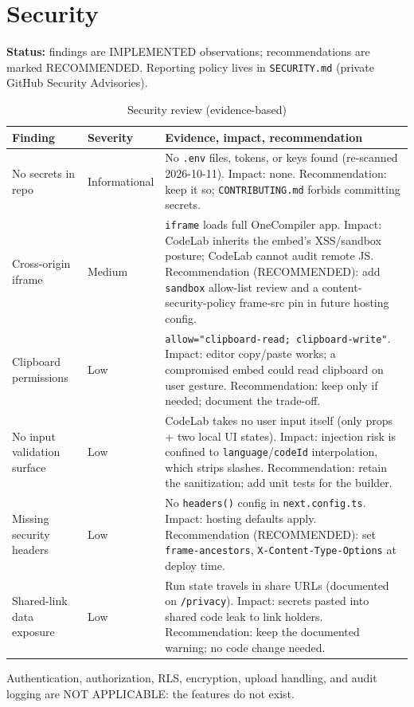 \section{Security}
\label{sec:security}

\textbf{Status:} findings are IMPLEMENTED observations; recommendations are marked RECOMMENDED. Reporting policy lives in \texttt{SECURITY.md} (private GitHub Security Advisories).

\begin{table}[H]
\centering
\caption{Security review (evidence-based)}
\begin{tabular}{|p{2.6cm}|l|p{7.5cm}|}
\hline
\textbf{Finding} & \textbf{Severity} & \textbf{Evidence, impact, recommendation} \\ \hline
No secrets in repo & Informational & No \texttt{.env} files, tokens, or keys found (re-scanned 2026-10-11). Impact: none. Recommendation: keep it so; \texttt{CONTRIBUTING.md} forbids committing secrets. \\ \hline
Cross-origin iframe & Medium & \texttt{iframe} loads full OneCompiler app. Impact: CodeLab inherits the embed's XSS/sandbox posture; CodeLab cannot audit remote JS. Recommendation (RECOMMENDED): add \texttt{sandbox} allow-list review and a content-security-policy frame-src pin in future hosting config. \\ \hline
Clipboard permissions & Low & \texttt{allow="clipboard-read; clipboard-write"}. Impact: editor copy/paste works; a compromised embed could read clipboard on user gesture. Recommendation: keep only if needed; document the trade-off. \\ \hline
No input validation surface & Low & CodeLab takes no user input itself (only props + two local UI states). Impact: injection risk is confined to \texttt{language}/\texttt{codeId} interpolation, which strips slashes. Recommendation: retain the sanitization; add unit tests for the builder. \\ \hline
Missing security headers & Low & No \texttt{headers()} config in \texttt{next.config.ts}. Impact: hosting defaults apply. Recommendation (RECOMMENDED): set \texttt{frame-ancestors}, \texttt{X-Content-Type-Options} at deploy time. \\ \hline
Shared-link data exposure & Low & Run state travels in share URLs (documented on \texttt{/privacy}). Impact: secrets pasted into shared code leak to link holders. Recommendation: keep the documented warning; no code change needed. \\ \hline
\end{tabular}
\end{table}

Authentication, authorization, RLS, encryption, upload handling, and audit logging are NOT APPLICABLE: the features do not exist.
